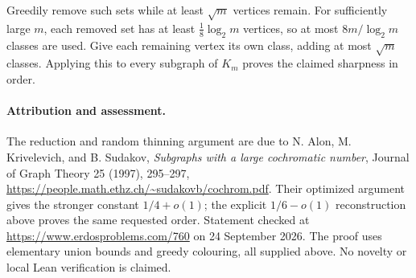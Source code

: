 Greedily remove such sets while at least \(\sqrt m\) vertices remain. For sufficiently large \(m\), each removed set has at least \(\tfrac18\log_2m\) vertices, so at most \(8m/\log_2m\) classes are used. Give each remaining vertex its own class, adding at most \(\sqrt m\) classes. Applying this to every subgraph of \(K_m\) proves the claimed sharpness in order.

\paragraph{Attribution and assessment.}
The reduction and random thinning argument are due to N. Alon, M. Krivelevich, and B. Sudakov, \emph{Subgraphs with a large cochromatic number}, Journal of Graph Theory 25 (1997), 295--297, \url{https://people.math.ethz.ch/~sudakovb/cochrom.pdf}. Their optimized argument gives the stronger constant \(1/4+o(1)\); the explicit \(1/6-o(1)\) reconstruction above proves the same requested order. Statement checked at \url{https://www.erdosproblems.com/760} on 24 September 2026. The proof uses elementary union bounds and greedy colouring, all supplied above. No novelty or local Lean verification is claimed.
